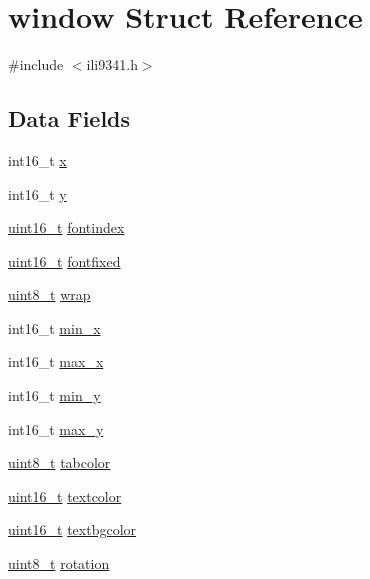 \hypertarget{structwindow}{\section{window Struct Reference}
\label{structwindow}
}


{\ttfamily \#include $<$ili9341.\-h$>$}

\subsection*{Data Fields}
\begin{DoxyCompactItemize}
\item 
int16\-\_\-t \hyperlink{structwindow_a879b99940dfc34772f0257f54c67b817}{x}
\item 
int16\-\_\-t \hyperlink{structwindow_a95c7023fc42e79ab42c291b90a490776}{y}
\item 
\hyperlink{earth2wireframe_8c_a273cf69d639a59973b6019625df33e30}{uint16\-\_\-t} \hyperlink{structwindow_a00da6dceaca10739712164daaa08a2dd}{fontindex}
\item 
\hyperlink{earth2wireframe_8c_a273cf69d639a59973b6019625df33e30}{uint16\-\_\-t} \hyperlink{structwindow_a5afd09eaf1e9c22fa611f0f529177ac9}{fontfixed}
\item 
\hyperlink{earth2wireframe_8c_aba7bc1797add20fe3efdf37ced1182c5}{uint8\-\_\-t} \hyperlink{structwindow_aee853dc29d3cf708890faff063ce9afb}{wrap}
\item 
int16\-\_\-t \hyperlink{structwindow_ad6317eef8afe6cee398bfaae876f8a1d}{min\-\_\-x}
\item 
int16\-\_\-t \hyperlink{structwindow_affe3812cbf97934375f43e82fdd76166}{max\-\_\-x}
\item 
int16\-\_\-t \hyperlink{structwindow_a33d39097fba2f3267bb0c003e88f4cd8}{min\-\_\-y}
\item 
int16\-\_\-t \hyperlink{structwindow_a84f9c809e082563b33f845f3b1da9bf3}{max\-\_\-y}
\item 
\hyperlink{earth2wireframe_8c_aba7bc1797add20fe3efdf37ced1182c5}{uint8\-\_\-t} \hyperlink{structwindow_a8cf49b061febfaaaf9a52793e80d4796}{tabcolor}
\item 
\hyperlink{earth2wireframe_8c_a273cf69d639a59973b6019625df33e30}{uint16\-\_\-t} \hyperlink{structwindow_aca878bb381210ef2ef8d764d08b126ae}{textcolor}
\item 
\hyperlink{earth2wireframe_8c_a273cf69d639a59973b6019625df33e30}{uint16\-\_\-t} \hyperlink{structwindow_ae49a3c2629ffa093e60edc3f9e9e0917}{textbgcolor}
\item 
\hyperlink{earth2wireframe_8c_aba7bc1797add20fe3efdf37ced1182c5}{uint8\-\_\-t} \hyperlink{structwindow_afbd48ebcb41e68d0f458dac593578aa8}{rotation}
\end{DoxyCompactItemize}


